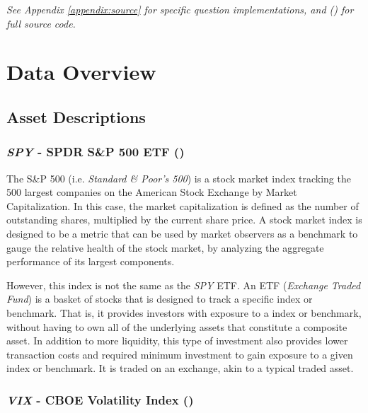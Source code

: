 \documentclass[10pt]{article}
\begin{document}
\begin{center}
    \textit{See Appendix \ref{appendix:source} for specific question implementations, and (\cite{Weerawarana2019}) for full source code.}
\end{center}



\newpage

\section{Data Overview}

    \subsection{Asset Descriptions}

        \subsubsection{\textit{SPY} - SPDR S\&P 500 ETF (\cite{StateStreetGlobalAdvisors2019})}

        The S\&P 500 (i.e. \textit{Standard \& Poor's 500}) is a stock market index tracking the 500 largest companies on the American Stock Exchange by Market Capitalization. In this case, the market capitalization is defined as the number of outstanding shares, multiplied by the current share price. A stock market index is designed to be a metric that can be used by market observers as a benchmark to gauge the relative health of the stock market, by analyzing the aggregate performance of its largest components.
            
        However, this index is not the same as the \textit{SPY} ETF. An ETF (\textit{Exchange Traded Fund}) is a basket of stocks that is designed to track a specific index or benchmark. That is, it provides investors with exposure to a index or benchmark, without having to own all of the underlying assets that constitute a composite asset. In addition to more liquidity, this type of investment also provides lower transaction costs and required minimum investment to gain exposure to a given index or benchmark. It is traded on an exchange, akin to a typical traded asset.

        \subsubsection{\textit{VIX} - CBOE Volatility Index (\cite{CBOEChicagoBoardOptionsExchange2019})}
\end{document}
